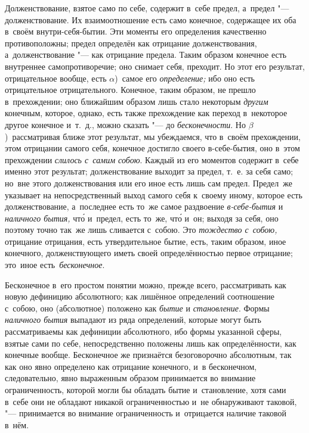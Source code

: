 Долженствование, взятое само по себе, содержит в~себе предел, а~предел "---
долженствование. Их взаимоотношение есть само конечное, содержащее их оба
в~своём внутри-себя-бытии. Эти моменты его определения качественно
противоположны; предел определён как отрицание долженствования,
а~долженствование "--- как отрицание предела. Таким образом конечное есть
внутреннее самопротиворечие; оно снимает себя, преходит. Но этот его результат,
отрицательное вообще, есть $\alpha$)~самое его {\em определение;} ибо оно есть
отрицательное отрицательного. Конечное, таким образом, не прешло в~прехождении;
оно ближайшим образом лишь стало некоторым {\em другим} конечным, которое,
однако, есть также прехождение как переход в~некоторое другое конечное и~т.~д.,
можно сказать "--- до {\em бесконечности}. Но $\beta$)~рассматривая ближе этот
результат, мы убеждаемся, что в~своём прехождении, этом отрицании самого себя,
конечное достигло своего в-себе-бытия, оно в~этом прехождении
{\em слилось с~самим собою}. Каждый из его моментов содержит в~себе именно этот
результат; долженствование выходит за предел, т.~е. за себя само; но~вне этого
долженствования или его иное есть лишь сам предел. Предел~же указывает
на непосредственный выход самого себя к~своему иному, которое есть
долженствование, а~последнее есть то~же самое раздвоение {\em в-себе-бытия} и
{\em наличного бытия,} чт\'{о} и~предел, есть то~же, чт\'{о} и~он; выходя за себя,
оно поэтому точно так~же лишь сливается с~собою. Это {\em тождество с~собою,}
отрицание отрицания, есть утвердительное бытие, есть, таким образом, иное
конечного, долженствующего иметь своей определённостью первое отрицание;
это~иное есть~{\em бесконечное}.


Бесконечное в~его простом понятии можно, прежде всего, рассматривать как новую
дефиницию абсолютного; как лишённое определений соотношение с~собою, оно
(абсолютное) положено как {\em бытие} и {\em становление}. Формы
{\em наличного бытия} выпадают из ряда определений, которые могут быть
рассматриваемы как дефиниции абсолютного, ибо формы указанной сферы, взятые
сами по себе, непосредственно положены лишь как определённости, как конечные
вообще. Бесконечное же признаётся безоговорочно абсолютным, так как оно явно
определено как отрицание конечного, и~в бесконечном, следовательно, явно
выраженным образом принимается во внимание ограниченность, которой могли бы
обладать бытие и~становление, хотя сами в~себе они не обладают никакой
ограниченностью и~не обнаруживают таковой, "--- принимается во внимание
ограниченность и~отрицается наличие таковой в~нём.

